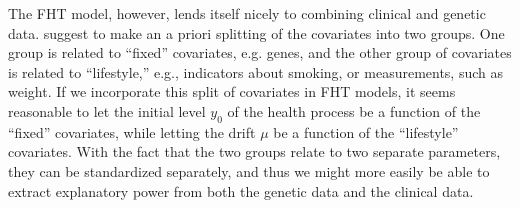 The FHT model, however, lends itself nicely to combining clinical and genetic data.
\citet{aalengjessing2001} suggest to make an a priori splitting of the covariates into two groups.
One group is related to ``fixed'' covariates, e.g. genes, and the other group of covariates is related to ``lifestyle,'' e.g., indicators about smoking, or measurements, such as weight.
If we incorporate this split of covariates in FHT models, it seems reasonable to let the initial level $y_0$ of the health process be a function of the ``fixed'' covariates, while letting the drift $\mu$ be a function of the ``lifestyle'' covariates.
With the fact that the two groups relate to two separate parameters, they can be standardized separately, and thus we might more easily be able to extract explanatory power from both the genetic data and the clinical data.